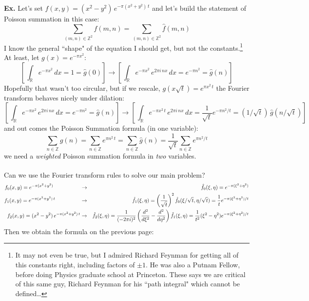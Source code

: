 \documentclass[12pt]{article}
\begin{document}
\noindent \textbf{Ex.} Let's set $f(x,y) = (x^2 - y^2) \, e^{- \pi (x^2 + y^2 )\,t}$ and let's build the statement of Poisson summation in this case:
$$\sum_{(m,n) \in \mathbb{Z}^2} f(m,n) = 
\sum_{(m,n) \in \mathbb{Z}^2} \widehat{f}(m,n)$$
I know the general ``shape" of the equation I should get, but not the constants.\footnote{It may not even be true, but I admired Richard Feynman for getting all of this constants right, including factors of $\pm 1$.  He was also a Putnam Fellow, before doing Physics graduate school at Princeton.  These says we are critical of this same guy, Richard Feynman for his ``path integral" which cannot be defined\dots} At least, let $g(x) = e^{-\pi x^2}$:
$$ \left[ \, \int_\mathbb{R} e^{-\pi x^2} \, dx = 1 = \hat{g}(0) \right] \to 
\left[ \, \int_\mathbb{R} e^{-\pi x^2} \, e^{2\pi i \, n x} \, dx = e^{- \pi n^2} = \hat{g}(n) \right] $$
Hopefully that wasn't too circular,  but if we rescale, $g(x \sqrt{t}) = e^{\pi x^2 \, t} $ the Fourier transform behaves nicely under dilation:
$$ \left[ \, \int_\mathbb{R} e^{-\pi x^2} \, e^{2\pi i \, n x} \, dx = e^{- \pi n^2} = \hat{g}(n) \right] \to 
\left[ \, \int_\mathbb{R} e^{-\pi x^2 \, t} \, e^{2\pi i \, n x} \, dx = \frac{1}{\sqrt{t}} e^{- \pi n^2 / t} = (1/\sqrt{t}) \, \hat{g}(n/\sqrt{t}) \right] $$
and out comes the Poisson Summation formula (in one variable):
$$ \sum_{n \in \mathbb{Z}} g(n) =   \sum_{n \in \mathbb{Z}} e^{\pi  n^2 \, t} =    \sum_{n \in \mathbb{Z}} \hat{g}(n) =  \frac{1}{\sqrt{t}} \sum_{n \in \mathbb{Z}} e^{\pi  n^2 / t} $$
we need a \textit{weighted} Poisson summation formula in \textit{two} variables. \\ \\
Can we use the Fourier transform rules to solve our main problem?
\begin{eqnarray*} 
f_0(x,y) = e^{- \pi (x^2 + y^2 )} \hspace{0.7in} &\to& \hat{f}_0(\xi,\eta) = e^{- \pi (\xi^2 + \eta^2 )}\\
f_1(x,y) = e^{- \pi (x^2 + y^2 )\,t} \hspace{0.65in} &\to& 
\hat{f}_1(\xi,\eta) =  \left( \frac{1}{\sqrt{t}} \right)^2 \hat{f}_0(\xi/\sqrt{t},\eta/\sqrt{t}) = \frac{1}{t} e^{- \pi (\xi^2 + \eta^2 )/t} \\
f_2(x,y) = (x^2 - y^2) \, e^{- \pi (x^2 + y^2 )\,t} &\to& 
\hat{f}_2(\xi, \eta) = \frac{1}{(-2\pi i)^2}\left( \frac{d^2}{d\xi^2} - \frac{d^2}{d\eta^2} \right)\hat{f}_1(\xi, \eta)
= \frac{1}{t^2} (\xi^2 - \eta^2) e^{- \pi (\xi^2 + \eta^2 )/t}
\end{eqnarray*}
Then we obtain the formula on the previous page:
\end{document}
